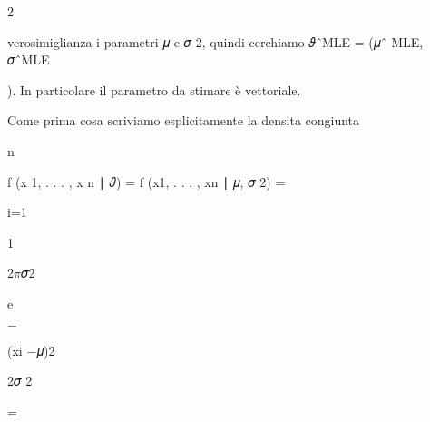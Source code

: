 \documentclass[a4paper,portrait,12pt]{article}
\begin{document}
2


\begin{flushleft}
verosimiglianza i parametri 𝜇 e 𝜎 2, quindi cerchiamo 𝜗ˆMLE = (𝜇ˆ MLE, 𝜎ˆMLE
\end{flushleft}


\begin{flushleft}
). In particolare il parametro da stimare \`{e} vettoriale.
\end{flushleft}


\begin{flushleft}
Come prima cosa scriviamo esplicitamente la densita congiunta
\end{flushleft}


\begin{flushleft}
n
\end{flushleft}





\begin{flushleft}
f (x 1, . . . , x n ∣ 𝜗) = f (x1, . . . , xn ∣ 𝜇, 𝜎 2) =
\end{flushleft}


\begin{flushleft}
i=1
\end{flushleft}





1


\begin{flushleft}
2$\pi$𝜎2
\end{flushleft}





\begin{flushleft}
e
\end{flushleft}





$-$





\begin{flushleft}
(xi $-$𝜇)2
\end{flushleft}


\begin{flushleft}
2𝜎 2
\end{flushleft}





=
\end{document}
